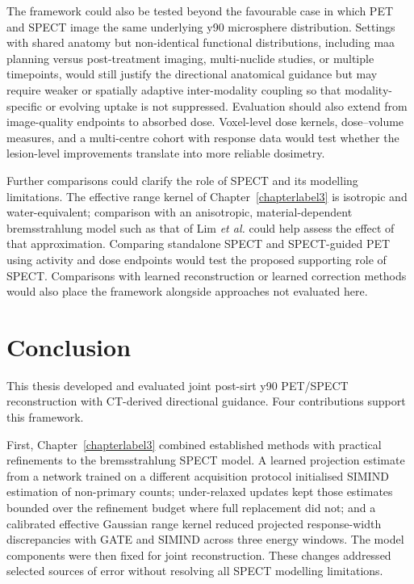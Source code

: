 The framework could also be tested beyond the favourable case in which PET and SPECT image the same underlying \gls{y90} microsphere distribution. Settings with shared anatomy but non-identical functional distributions, including \acrfull{maa} planning versus post-treatment imaging, multi-nuclide studies, or multiple timepoints, would still justify the directional anatomical guidance but may require weaker or spatially adaptive inter-modality coupling so that modality-specific or evolving uptake is not suppressed. Evaluation should also extend from image-quality endpoints to absorbed dose. Voxel-level dose kernels, dose--volume measures, and a multi-centre cohort with response data would test whether the lesion-level improvements translate into more reliable dosimetry.

Further comparisons could clarify the role of SPECT and its modelling limitations. The effective range kernel of Chapter~\ref{chapterlabel3} is isotropic and water-equivalent; comparison with an anisotropic, material-dependent bremsstrahlung model such as that of Lim \textit{et al.} \cite{lim_y-90_2018} could help assess the effect of that approximation. Comparing standalone SPECT and SPECT-guided PET using activity and dose endpoints would test the proposed supporting role of SPECT. Comparisons with learned reconstruction or learned correction methods \cite{hashimotoPETImageReconstruction2022,jia90YSPECTScatter2023} would also place the framework alongside approaches not evaluated here.

\section{Conclusion}
\label{sec:thesis_conclusion}

This thesis developed and evaluated joint post-\gls{sirt} \gls{y90} PET/SPECT reconstruction with CT-derived directional guidance. Four contributions support this framework.

First, Chapter~\ref{chapterlabel3} combined established methods with practical refinements to the bremsstrahlung SPECT model. A learned projection estimate from a network trained on a different acquisition protocol initialised SIMIND estimation of non-primary counts; under-relaxed updates kept those estimates bounded over the refinement budget where full replacement did not; and a calibrated effective Gaussian range kernel reduced projected response-width discrepancies with GATE and SIMIND across three energy windows. The model components were then fixed for joint reconstruction. These changes addressed selected sources of error without resolving all SPECT modelling limitations.

